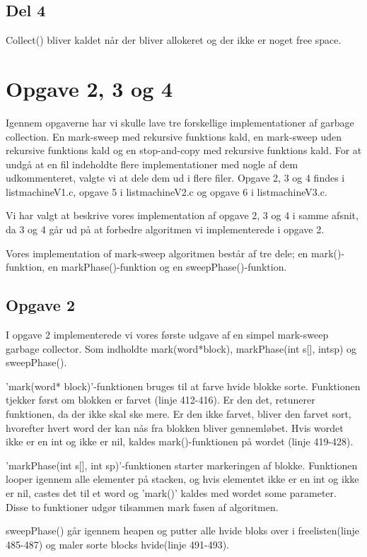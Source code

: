 \subsection{Del 4}
\label{O1_4}
Collect() bliver kaldet når der bliver allokeret og der ikke er noget free space.

\section{Opgave 2, 3 og 4}
\label{O2}
Igennem opgaverne har vi skulle lave tre forskellige implementationer af garbage collection. En mark-sweep med rekursive funktions kald, en mark-sweep uden rekursive funktions kald og en stop-and-copy med rekursive funktions kald. For at undgå at en fil indeholdte flere implementationer med nogle af dem udkommenteret, valgte vi at dele dem ud i flere filer. Opgave 2, 3 og 4 findes i listmachineV1.c, opgave 5 i listmachineV2.c og opgave 6 i listmachineV3.c.

Vi har valgt at beskrive vores implementation af opgave 2, 3 og 4 i samme afsnit, da 3 og 4 går ud på at forbedre algoritmen vi implementerede i opgave 2.

Vores implementation of mark-sweep algoritmen består af tre dele; en mark()-funktion, en markPhase()-funktion og en sweepPhase()-funktion. 

\subsection{Opgave 2}
\label{O2_2}
I opgave 2 implementerede vi vores første udgave af en simpel mark-sweep garbage collector. Som indholdte mark(word*block), markPhase(int s[], intsp) og sweepPhase().

'mark(word* block)'-funktionen bruges til at farve hvide blokke sorte. Funktionen tjekker først om blokken er farvet (linje 412-416). Er den det, retunerer funktionen, da der ikke skal ske mere. Er den ikke farvet, bliver den farvet sort, hvorefter hvert word der kan nås fra blokken bliver gennemløbet. Hvis wordet ikke er en int og ikke er nil, kaldes mark()-funktionen på wordet (linje 419-428).

'markPhase(int s[], int sp)'-funktionen starter markeringen af blokke. Funktionen looper igennem alle elementer på stacken, og hvis elementet ikke er en int og ikke er nil, castes det til et word og 'mark()' kaldes med wordet some parameter. Disse to funktioner udgør tilsammen mark fasen af algoritmen.

sweepPhase() går igennem heapen og putter alle hvide bloks over i freelisten(linje 485-487) og maler sorte blocks hvide(linje 491-493).

